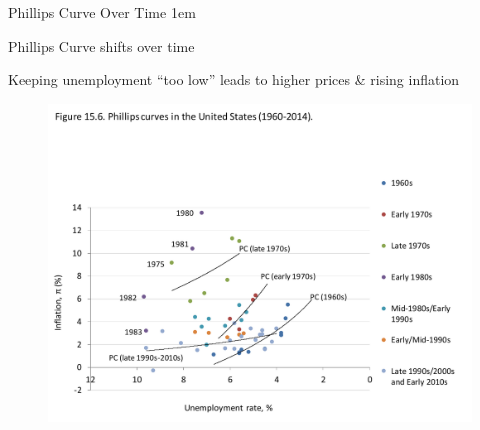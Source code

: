 \documentclass[11pt,aspectratio=43,usenames,dvipsnames]{beamer}
\let\olditemize=\itemize
\let\endolditemize=\enditemize
\renewenvironment{itemize}{\olditemize \itemsep1em}{\endolditemize}
\theoremstyle{definition}
\begin{document}
\begin{frame}{Phillips Curve Over Time}
\label{slide:Phillips_Curve_Over_Time}
            \begin{itemize}
                \item Phillips Curve shifts over time
                \item Keeping unemployment ``too low'' leads to higher prices \& rising inflation
            \end{itemize}
            \begin{figure}
                \centering
                \includegraphics[trim={0cm 0cm 0cm 4.5cm}, clip, width=.8\textwidth]{./figures/9.pdf}
            \end{figure}
\end{frame}
\end{document}
